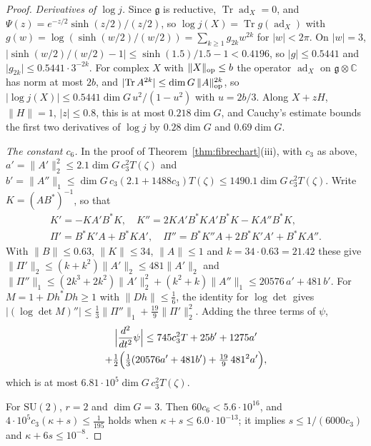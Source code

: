 \documentclass[11pt]{amsart}
\theoremstyle{definition}
\theoremstyle{remark}
\numberwithin{equation}{section}
\newcommand{\C}{\mathbb{C}}
\newcommand{\SU}{\mathrm{SU}}
\newcommand{\g}{\mathfrak{g}}
\newcommand{\Tr}{\operatorname{Tr}}
\begin{document}
\begin{proof}
\emph{Derivatives of $\log j$.} Since $\g$ is reductive, $\Tr\operatorname
{ad}_X=0$, and $\Psi(z)=e^{-z/2}\sinh(z/2)/(z/2)$, so $\log j(X)=\Tr g(
\operatorname{ad}_X)$ with $g(w)=\log(\sinh(w/2)/(w/2))=\sum_{k\ge1}g_{2k}
w^{2k}$ for $\lvert w\rvert<2\pi$. On $\lvert w\rvert=3$, $\lvert\sinh(w/2)
/(w/2)-1\rvert\le\sinh(1.5)/1.5-1<0.4196$, so $\lvert g\rvert\le0.5441$ and
$\lvert g_{2k}\rvert\le0.5441\cdot3^{-2k}$. For complex $X$ with $\lVert X
\rVert_{\rm op}\le b$ the operator $\operatorname{ad}_X$ on $\g\otimes\C$
has norm at most $2b$, and $\lvert\Tr A^{2k}\rvert\le\dim G\,\lVert A
\rVert_{\rm op}^{2k}$, so $\lvert\log j(X)\rvert\le0.5441\dim G\,u^2/(1-u^2)$
with $u=2b/3$. Along $X+zH$, $\lVert H\rVert=1$, $\lvert z\rvert\le0.8$, this
is at most $0.218\dim G$, and Cauchy's estimate bounds the first two
derivatives of $\log j$ by $0.28\dim G$ and $0.69\dim G$.

\emph{The constant $c_6$.} In the proof of Theorem~\ref{thm:fibrechart}(iii),
with $c_3$ as above, $a'=\lVert A'\rVert_2^2\le2.1\dim G\,c_3^2T(\zeta)$ and
$b'=\lVert A''\rVert_1\le\dim G\,c_3(2.1+1488c_3)T(\zeta)\le1490.1\dim G\,
c_3^2T(\zeta)$. Write $K=(AB^*)^{-1}$, so that
\begin{gather*}
K'=-KA'B^*K,\quad K''=2KA'B^*KA'B^*K-KA''B^*K,\\
\Pi'=B^*K'A+B^*KA',\quad\Pi''=B^*K''A+2B^*K'A'+B^*KA''.
\end{gather*} With $\lVert B\rVert\le0.63$, $\lVert K\rVert\le34$, $\lVert A\rVert
\le1$ and $k=34\cdot0.63=21.42$ these give $\lVert\Pi'\rVert_2\le(k+k^2)
\lVert A'\rVert_2\le481\lVert A'\rVert_2$ and $\lVert\Pi''\rVert_1\le(2k^3+
2k^2)\lVert A'\rVert_2^2+(k^2+k)\lVert A''\rVert_1\le20576\,a'+481\,b'$.
For $M=1+Dh^*Dh\ge1$ with $\lVert Dh\rVert\le\frac16$, the identity for
$\log\det$ gives $\lvert(\log\det M)''\rvert\le\frac13\lVert\Pi''\rVert_1+
\frac{19}9\lVert\Pi'\rVert_2^2$. Adding the three terms of $\psi$,
\begin{multline*}
\Bigl\lvert\frac{d^2}{dt^2}\psi\Bigr\rvert\le745c_3^2T+25b'+1275a'\\
+\tfrac12\Bigl(\tfrac13(20576a'+481b')+\tfrac{19}9\,481^2a'\Bigr),
\end{multline*}
which is at most $6.81\cdot10^5\dim G\,c_3^2T(\zeta)$.

For $\SU(2)$, $r=2$ and $\dim G=3$. Then $60c_6<5.6\cdot10^{16}$, and $4\cdot
10^5c_3(\kappa+s)\le\frac1{195}$ holds when $\kappa+s\le6.0\cdot10^{-13}$;
it implies $s\le1/(6000c_3)$ and $\kappa+6s\le10^{-8}$.
\end{proof}
\end{document}
